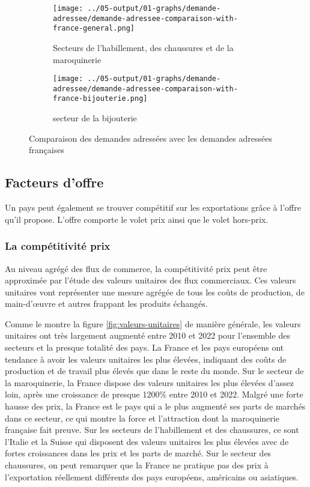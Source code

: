 \documentclass[french,10pt,a4paper]{article}
\begin{document}
\begin{figure}[!h]
  \centering
  \begin{subfigure}{\textwidth}
    \centering    \texttt{[image: ../05-output/01-graphs/demande-adressee/demande-adressee-comparaison-with-france-general.png]}
    \caption{Secteurs de l'habillement, des chaussures et de la maroquinerie}
    \label{fig:demande-adressee-comparaison-with-france-general}
  \end{subfigure}
  \vspace{0.5cm}
  \begin{subfigure}{\textwidth}
    \centering \texttt{[image: ../05-output/01-graphs/demande-adressee/demande-adressee-comparaison-with-france-bijouterie.png]}
 \caption{secteur de la bijouterie}
 \label{fig:demande-adressee-comparaison-with-france-bijouterie}
  \end{subfigure}
  \caption{Comparaison des demandes adressées avec les demandes adressées françaises}
  \label{fig:demande-adressee}
\end{figure}


\subsection{Facteurs d'offre}
Un pays peut également se trouver compétitif sur les exportations grâce à l'offre qu'il propose. L'offre comporte le volet prix ainsi que le volet hors-prix.


\subsubsection{La compétitivité prix}
Au niveau agrégé des flux de commerce, la compétitivité prix peut être approximée par l'étude des valeurs unitaires des flux commerciaux. Ces valeurs unitaires vont représenter une mesure agrégée de tous les coûts de production, de main-d'œuvre et autres frappant les produits échangés.

Comme le montre la figure \ref{fig:valeurs-unitaires} de manière générale, les valeurs unitaires ont très largement augmenté entre 2010 et 2022 pour l'ensemble des secteurs et la presque totalité des pays. La France et les pays européens ont tendance à avoir les valeurs unitaires les plus élevées, indiquant des coûts de production et de travail plus élevés que dans le reste du monde. Sur le secteur de la maroquinerie, la France dispose des valeurs unitaires les plus élevées d'assez loin, après une croissance de presque 1200\% entre 2010 et 2022. Malgré une forte hausse des prix, la France est le pays qui a le plus augmenté ses parts de marchés dans ce secteur, ce qui montre la force et l'attraction dont la maroquinerie française fait preuve. Sur les secteurs de l'habillement et des chaussures, ce sont l'Italie et la Suisse qui disposent des valeurs unitaires les plus élevées avec de fortes croissances dans les prix et les parts de marché. Sur le secteur des chaussures, on peut remarquer que la France ne pratique pas des prix à l'exportation réellement différents des pays européens, américains ou asiatiques.
\end{document}
